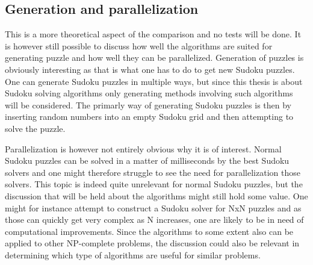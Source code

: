 \documentclass[a4paper,11pt]{kth-mag}
\begin{document}
\FloatBarrier
\subsection{Generation and parallelization}
This is a more theoretical aspect of the comparison and no tests will be done.
It is however still possible to discuss how well the algorithms are suited for generating puzzle and how well they can be parallelized. 
Generation of puzzles is obviously interesting as that is what one has to do to get new Sudoku puzzles.
One can generate Sudoku puzzles in multiple ways, but since this thesis is about Sudoku solving algorithms only generating methods involving such algorithms will be considered.
The primarly way of generating Sudoku puzzles is then by inserting random numbers into an empty Sudoku grid and then attempting to solve the puzzle.

Parallelization is however not entirely obvious why it is of interest. 
Normal Sudoku puzzles can be solved in a matter of milliseconds by the best Sudoku solvers and one might therefore struggle to see the need for parallelization those solvers. 
This topic is indeed quite unrelevant for normal Sudoku puzzles, but the discussion that will be held about the algorithms might still hold some value.
One might for instance attempt to construct a Sudoku solver for NxN puzzles and as those can quickly get very complex as N increases, one are likely to be in need of computational improvements.  
Since the algorithms to some extent also can be applied to other NP-complete problems, the discussion could also be relevant in determining which type of algorithms are useful for similar problems. 

\FloatBarrier
\end{document}
